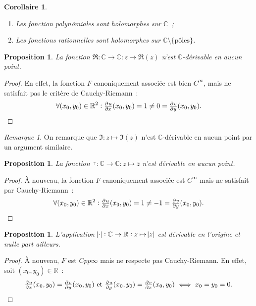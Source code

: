 \documentclass{report}
\newtheorem{prp}[thm]{Proposition}
\newtheorem{cor}[thm]{Corollaire}
\theoremstyle{definition}
\theoremstyle{remark}
\newtheorem*{rmq}{Remarque}
\numberwithin{equation}{section}
\newcommand{\C}{\mathbb C}
\newcommand{\R}{\mathbb R}
\newcommand{\poles}{{\{\text{pôles}\}}}
\begin{document}
			\begin{cor}~
				\begin{enumerate}
					\item Les fonction polynômiales sont holomorphes sur $\C$~;
					\item Les fonctions rationnelles sont holomorphes sur $\C \setminus \poles$.
				\end{enumerate}
			\end{cor}

			\begin{prp} La fonction $\Re : \C \to \C : z \mapsto \Re(z)$ n'est $\C$-dérivable en aucun point.
			\end{prp}

			\begin{proof} En effet, la fonction $F$ canoniquement associée est bien $C^\infty$, mais ne satisfait pas le critère de Cauchy-Riemann~:
			\begin{equation}
				\forall (x_0, y_0) \in \R^2 : \pd ux(x_0, y_0) = 1 \neq 0 = \pd vy(x_0, y_0).
			\end{equation}
			\end{proof}

			\begin{rmq} On remarque que $\Im : z \mapsto \Im(z)$ n'est $\C$-dérivable en aucun point par un argument similaire.
			\end{rmq}

			\begin{prp} La fonction $\bar \cdot : \C \to \C : z \mapsto \bar z$ n'est dérivable en aucun point.
			\end{prp}

			\begin{proof} À nouveau, la fonction $F$ canoniquement associée est $C^\infty$ mais ne satisfait par Cauchy-Riemann~:
			\begin{equation}
				\forall (x_0, y_0) \in \R^2 : \pd ux(x_0, y_0) = 1 \neq -1 = \pd vy(x_0, y_0).
			\end{equation}
			\end{proof}

			\begin{prp} L'application $\abs \cdot : \C \to \R : z \mapsto \abs z$ est dérivable en l'origine et nulle part ailleurs.
			\end{prp}

			\begin{proof} À nouveau, $F$ est $Cpp\infty$ mais ne respecte pas Cauchy-Riemann. En effet, soit $(x_0, y_0) \in \R$~:
			\begin{equation}
				\pd ux(x_0, y_0) = \pd vy(x_0, y_0) \text{ et } \pd uy(x_0, y_0) = \pd vx(x_0, y_0) \iff x_0 = y_0 = 0.
			\end{equation}
			\end{proof}
\end{document}
